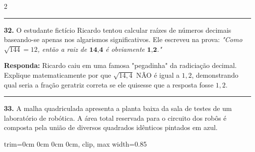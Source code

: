 \documentclass[twoside, 10pt, a4paper]{article}
\newlength{\espacoPreQuestao}\setlength{\espacoPreQuestao}{0.1cm}
\newlength{\espacoQuestao}\setlength{\espacoQuestao}{0.2cm}
\newcommand{\larguraTikz}{0.85\linewidth}
\begin{document}
\begin{multicols*}{2}
\noindent\textcolor{CorLinha}{\rule{\linewidth}{0.5pt}} 
\par\vspace{\espacoPreQuestao}
\textbf{32.} O estudante fictício Ricardo tentou calcular raízes de números decimais baseando-se apenas nos algarismos significativos. Ele escreveu na prova: 
\textit{"Como $ \sqrt{144} = 12 $, então a raiz de $ \textbf{14,4} $ é obviamente $ \textbf{1,2} $."}
\begin{boxresponda}
\textbf{Responda:} Ricardo caiu em uma famosa "pegadinha" da radiciação decimal. Explique matematicamente por que $ \sqrt{14,4} $ NÃO é igual a $ 1,2 $, demonstrando qual seria a fração geratriz correta se ele quisesse que a resposta fosse $ 1,2 $.
\end{boxresponda}
\par\vspace{\espacoQuestao}

\noindent\textcolor{CorLinha}{\rule{\linewidth}{0.5pt}} 
\par\vspace{\espacoPreQuestao}
\textbf{33.} A malha quadriculada apresenta a planta baixa da sala de testes de um laboratório de robótica. A área total reservada para o circuito dos robôs é composta pela união de diversos quadrados idênticos pintados em azul.
\begin{center}
\begin{adjustbox}{trim=0cm 0cm 0cm 0cm, clip, max width=\larguraTikz}
\end{adjustbox}
\end{center}
\end{multicols*}
\end{document}
